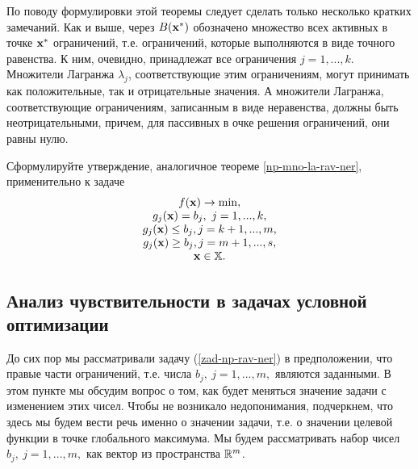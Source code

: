     По поводу формулировки этой теоремы следует сделать только несколько
    кратких замечаний. Как и выше, через $B(\mathbf{x^{*}})$ обозначено
    множество всех активных в точке $\mathbf{x^{*}}$ ограничений, т.е.
    ограничений, которые выполняются в виде точного равенства. К
    ним, очевидно, принадлежат все ограничения $j=1,...,k$.
    Множители Лагранжа $\lambda_{j}$, соответствующие этим
    ограничениям, могут принимать как положительные, так и
    отрицательные значения. А множители Лагранжа, соответствующие
    ограничениям, записанным в виде неравенства, должны быть
    неотрицательными, причем, для пассивных в очке решения
    ограничений, они равны нулю.

\begin{exer}
    Сформулируйте утверждение, аналогичное теореме
\ref{np-mno-la-rav-ner}, применительно к задаче
\[
\begin{array}{c}
  f(\mathbf{x})\rightarrow\min, \\
  g_{j}(\mathbf{x})=b_{j}, \ j=1,...,k, \\
  g_{j}(\mathbf{x})\leq b_{j}, j=k+1,...,m, \\
  g_{j}(\mathbf{x})\geq b_{j}, j=m+1,...,s, \\
  \mathbf{x}\in\mathbb{X}.
\end{array}
\]
\end{exer}



\subsection{Анализ чувствительности в задачах условной оптимизации}

    До сих пор мы рассматривали задачу (\ref{zad-np-rav-ner}) в
    предположении, что правые части ограничений, т.е. числа $b_{j}, \
    j=1,...,m,$ являются заданными. В этом пункте мы обсудим вопрос
    о том, как будет меняться значение задачи с изменением этих
    чисел. Чтобы не возникало недопонимания, подчеркнем, что здесь мы
    будем вести речь именно о значении задачи, т.е. о значении
    целевой функции в точке глобального максимума. Мы будем
    рассматривать набор чисел $b_{j}, \ j=1,...,m,$ как вектор из
    пространства $\mathbb{R}^{m}$.



